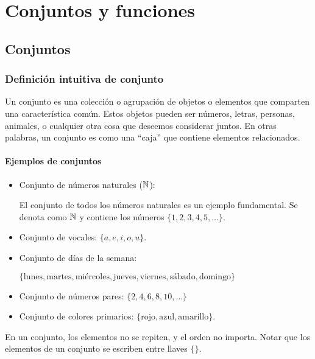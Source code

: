 \chapter{Conjuntos y funciones}

\section{Conjuntos} \label{sec:conjuntos}
\subsection{Definición intuitiva de conjunto}

Un conjunto es una colección o agrupación de objetos o elementos que comparten una característica común. Estos objetos pueden ser números, letras, personas, animales, o cualquier otra cosa que deseemos considerar juntos. En otras palabras, un conjunto es como una ``caja'' que contiene elementos relacionados.

\subsubsection{Ejemplos de conjuntos}

\begin{itemize}
	\item Conjunto de números naturales ($\mathbb{N}$):
	
	El conjunto de todos los números naturales es un ejemplo fundamental. Se denota como $\mathbb{N}$ y contiene los números $\{ 1, 2, 3, 4, 5, \ldots \}$.
	
	\item Conjunto de vocales: $\{a, e, i, o, u\}$.
	
	\item Conjunto de días de la semana:
	
	$\{ \text{lunes}, \text{martes}, \text{miércoles}, \text{jueves}, \text{viernes}, \text{sábado}, \text{domingo} \}$
	
	\item Conjunto de números pares: $\{2, 4, 6, 8, 10, \ldots \}$
	
	\item Conjunto de colores primarios: $\{\text{rojo}, \text{azul}, \text{amarillo}\}$.
\end{itemize}

En un conjunto, los elementos no se repiten, y el orden no importa. Notar que los elementos de un conjunto se escriben entre llaves $\{ \}$.

